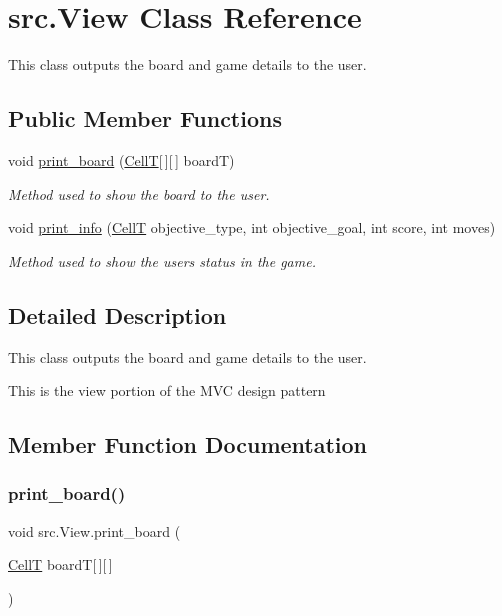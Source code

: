 \hypertarget{classsrc_1_1View}{}\section{src.\+View Class Reference}
\label{classsrc_1_1View}


This class outputs the board and game details to the user.  


\subsection*{Public Member Functions}
\begin{DoxyCompactItemize}
\item 
void \hyperlink{classsrc_1_1View_aabba85aef3d6d4b536e8ebeb90a74c11}{print\+\_\+board} (\hyperlink{enumsrc_1_1CellT}{CellT}\mbox{[}$\,$\mbox{]}\mbox{[}$\,$\mbox{]} boardT)
\begin{DoxyCompactList}\small\item\em Method used to show the board to the user. \end{DoxyCompactList}\item 
void \hyperlink{classsrc_1_1View_a9217f30028e2538b9ff66db46b0a5dbb}{print\+\_\+info} (\hyperlink{enumsrc_1_1CellT}{CellT} objective\+\_\+type, int objective\+\_\+goal, int score, int moves)
\begin{DoxyCompactList}\small\item\em Method used to show the users status in the game. \end{DoxyCompactList}\end{DoxyCompactItemize}


\subsection{Detailed Description}
This class outputs the board and game details to the user. 

This is the view portion of the M\+VC design pattern 

\subsection{Member Function Documentation}
\mbox{\label{classsrc_1_1View_aabba85aef3d6d4b536e8ebeb90a74c11}} 
\subsubsection{\texorpdfstring{print\+\_\+board()}{print\_board()}}
{\footnotesize\ttfamily void src.\+View.\+print\+\_\+board (\begin{DoxyParamCaption}\item[{\hyperlink{enumsrc_1_1CellT}{CellT}}]{boardT\mbox{[}$\,$\mbox{]}\mbox{[}$\,$\mbox{]} }\end{DoxyParamCaption})}



